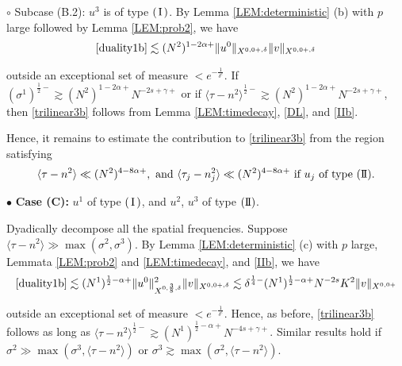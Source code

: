 \documentclass[11pt]{amsart}
\numberwithin{equation}{section} \numberwithin{theorem}{section}
\begin{document}
{
\noindent} $\circ$ Subcase (B.2): $u^3$ is of type $({\hspace{0.5mm}\text{I}\hspace{0.5mm}})$. 
By Lemma \ref{LEM:deterministic} (b) with $p$ large followed by Lemma \ref{LEM:prob2}, we have 
\begin{align*}
	\eqref{duality1b} 
	\lesssim (N^2)^{1-2{\alpha}+}\|u^0\|_{X^{0, 0+, {\delta}}}\|v\|_{X^{0, 0+, {\delta}}} 
\end{align*}

{
\noindent} outside an exceptional set of measure $<e^{-\frac{1}{{\delta}^c}}$. If $({\sigma}^1)^{\frac{1}{2}-} \gtrsim (N^2)^{1-2{\alpha}+}N^{-2s+{\gamma}+}$ or if ${\langle {\tau - n^2} \rangle}^{\frac{1}{2}-} \gtrsim (N^2)^{1-2{\alpha}+}N^{-2s+{\gamma}+}$, 
then \eqref{trilinear3b} follows from Lemma \ref{LEM:timedecay}, \eqref{DL}, and \eqref{IIb}. 

Hence, it remains to estimate the contribution to \eqref{trilinear3b}
from the region satisfying
\begin{equation}
	\label{caseB2} {\langle {\tau - n^2} \rangle} \ll (N^2)^{4-8{\alpha}+}, \text{ and } {\langle {\tau_j - n_j^2} \rangle} \ll (N^2)^{4-8{\alpha}+} \text{ if } u_j \text{ of type }({\text{I \hspace{-2.8mm} I} }). 
\end{equation}

\medskip

{
\noindent} $\bullet$ {\bf Case (C):} $u^1$ of type $({\hspace{0.5mm}\text{I}\hspace{0.5mm}})$, and $u^2$, $u^3$ of type $({\text{I \hspace{-2.8mm} I} })$.

Dyadically decompose all the spatial frequencies. Suppose ${\langle {\tau - n^2} \rangle} \gg \max({\sigma}^2, {\sigma}^3)$. 
By Lemma \ref{LEM:deterministic} (c) with $p$ large, Lemmata \ref{LEM:prob2} and \ref{LEM:timedecay},
and \eqref{IIb}, we have 
\begin{align*}
	\eqref{duality1b}  
	 \lesssim (N^1)^{\frac{1}{2}-{\alpha}+}\|u^0\|_{X^{0, \frac{3}{8}, {\delta}}}^2\|v\|_{X^{0, 0+, {\delta}}} 
	\lesssim {\delta}^{\frac{1}{4}-} (N^1)^{\frac{1}{2}-{\alpha}+} N^{-2s}K^2 \|v\|_{X^{0, 0+}} 
\end{align*}

{
\noindent} outside an exceptional set of measure $<e^{-\frac{1}{{\delta}^c}}$. 
Hence, as before, \eqref{trilinear3b} follows as long as ${\langle {\tau - n^2} \rangle}^{\frac{1}{2}-} \gtrsim (N^1)^{ \frac{1}{2} - {\alpha}+}N^{-4s+{\gamma}+}$. Similar results hold if ${\sigma}^2 \gg \max({\sigma}^3, {\langle {\tau-n^2} \rangle})$ or ${\sigma}^3 \gtrsim \max({\sigma}^2, {\langle {\tau-n^2} \rangle})$. 
\end{document}
